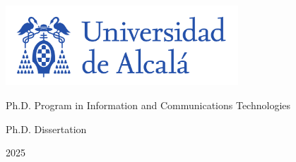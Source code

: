\thispagestyle{empty}
\large
\begin{center}

  \color{pantone293}

  \centerline{\includegraphics[height=3cm]{include/img/logo_uah_nombre.pdf}}
  
  \vspace{2cm}

  \huge{Ph.D. Program in Information and Communications Technologies}

  \vspace{2cm}

  \Huge\textbf{\titulotesis}

  \vspace{5cm}

  \huge{{Ph.D. Dissertation}}\\
  \vspace{2mm}
  \huge{\textbf{\autortesis}}

  \vspace{10mm}

  \color{black}
  
\end{center}

\begin{bottomparagraph}
  \begin{center}

    \color{pantone293}

      \huge {2025}
    \color{black}

  \end{center}
\end{bottomparagraph}